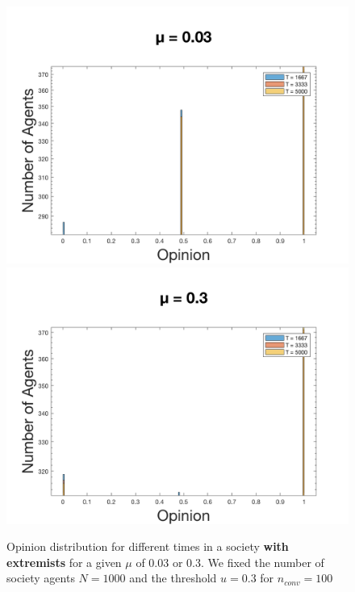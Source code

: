 \documentclass[11pt]{article}
\begin{document}
\begin{figure}[!htb]
  \includegraphics[width=\linewidth]{gen_plot_geil_klein_mu.png}
\endminipage\hfill
{}
  \includegraphics[width=\linewidth]{gen_plot_geil_gross_mu.png}
\endminipage
\caption{Opinion distribution for different times in a society \textbf{with extremists} for a given $\mu$ of 0.03 or 0.3. We fixed the number of society agents $N = 1000$ and the threshold $u = 0.3$ for $n_{conv} = 100$}
\label{fig:muwithextremists2}
\end{figure}
\end{document}
